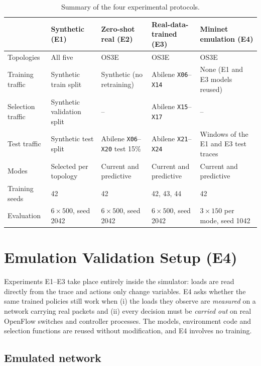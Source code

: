 \begin{table}[htbp]
\centering
\caption{Summary of the four experimental protocols.}
\label{tab:protocols}
\small
\begin{tabularx}{\textwidth}{@{}p{2.3cm}LLLL@{}}
\toprule
 & \textbf{Synthetic (E1)} & \textbf{Zero-shot real (E2)} & \textbf{Real-data-trained (E3)} & \textbf{Mininet emulation (E4)}\\
\midrule
Topologies & All five & OS3E & OS3E & OS3E\\
Training traffic & Synthetic train split & Synthetic (no retraining) & Abilene \texttt{X06}--\texttt{X14} & None (E1 and E3 models reused)\\
Selection traffic & Synthetic validation split & -- & Abilene \texttt{X15}--\texttt{X17} & --\\
Test traffic & Synthetic test split & Abilene \texttt{X06}--\texttt{X20} test 15\% & Abilene \texttt{X21}--\texttt{X24} & Windows of the E1 and E3 test traces\\
Modes & Selected per topology & Current and predictive & Current and predictive & Current and predictive\\
Training seeds & 42 & 42 & 42, 43, 44 & 42\\
Evaluation & $6\times500$, seed 2042 & $6\times500$, seed 2042 & $6\times500$, seed 2042 & $3\times150$ per mode, seed 1042\\
\bottomrule
\end{tabularx}
\end{table}

\section{Emulation Validation Setup (E4)}
\label{sec:mininet-setup}

Experiments E1--E3 take place entirely inside the simulator: loads are read directly from the trace and actions only change variables. E4 asks whether the same trained policies still work when (i) the loads they observe are \emph{measured} on a network carrying real packets and (ii) every decision must be \emph{carried out} on real OpenFlow switches and controller processes. The models, environment code and selection functions are reused without modification, and E4 involves no training.

\subsection{Emulated network}

